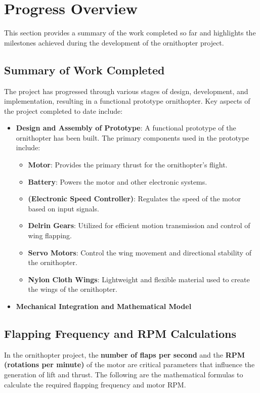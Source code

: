 \chapter{Progress Overview}

This section provides a summary of the work completed so far and highlights the milestones achieved during the development of the ornithopter project.

\section{Summary of Work Completed}
The project has progressed through various stages of design, development, and implementation, resulting in a functional prototype ornithopter. Key aspects of the project completed to date include:

\begin{itemize}
    \item \textbf{Design and Assembly of Prototype}: A functional prototype of the ornithopter has been built. The primary components used in the prototype include:
    \begin{itemize}
        \item \textbf{\bldc Motor}: Provides the primary thrust for the ornithopter's flight.
        \item \textbf{\lipo Battery}: Powers the motor and other electronic systems.
        \item \textbf{\esc (Electronic Speed Controller)}: Regulates the speed of the motor based on input signals.
        \item \textbf{Delrin Gears}: Utilized for efficient motion transmission and control of wing flapping.
        \item \textbf{Servo Motors}: Control the wing movement and directional stability of the ornithopter.
        \item \textbf{Nylon Cloth Wings}: Lightweight and flexible material used to create the wings of the ornithopter.
    \end{itemize}
    
    \item \textbf{Mechanical Integration and Mathematical Model}
\end{itemize}

\section{Flapping Frequency and RPM Calculations}
In the ornithopter project, the \textbf{number of flaps per second} and the \textbf{RPM (rotations per minute)} of the motor are critical parameters that influence the generation of lift and thrust. The following are the mathematical formulas to calculate the required flapping frequency and motor RPM.

